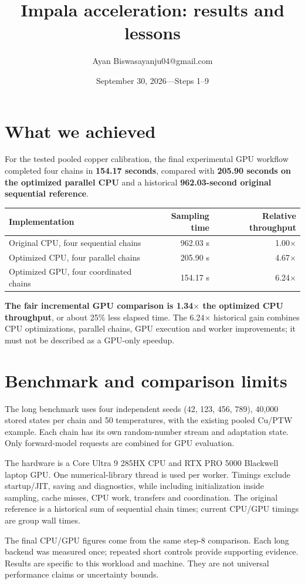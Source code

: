 \documentclass[11pt]{article}
\title{Impala acceleration: results and lessons}
\author{Ayan Biswas\quad ayanju04@gmail.com}
\date{September 30, 2026\quad---\quad Steps 1--9}
\newcommand{\heading}[1]{\section*{#1}}
\begin{document}
\maketitle
\heading{What we achieved}
For the tested pooled copper calibration, the final experimental GPU workflow
completed four chains in \textbf{154.17 seconds}, compared with
\textbf{205.90 seconds on the optimized parallel CPU} and a historical
\textbf{962.03-second original sequential reference}.

\begin{center}
\begin{tabular}{lrr}
\toprule
Implementation & Sampling time & Relative throughput\\
\midrule
Original CPU, four sequential chains & 962.03 s & 1.00$\times$\\
Optimized CPU, four parallel chains & 205.90 s & 4.67$\times$\\
Optimized GPU, four coordinated chains & 154.17 s & 6.24$\times$\\
\bottomrule
\end{tabular}
\end{center}
\textbf{The fair incremental GPU comparison is 1.34$\times$ the optimized CPU
throughput}, or about 25\% less elapsed time. The 6.24$\times$ historical gain
combines CPU optimizations, parallel chains, GPU execution and worker improvements;
it must not be described as a GPU-only speedup.

\heading{Benchmark and comparison limits}
The long benchmark uses four independent seeds (42, 123, 456, 789), 40,000 stored
states per chain and 50 temperatures, with the existing pooled Cu/PTW example.
Each chain has its own random-number stream and adaptation state. Only forward-model
requests are combined for GPU evaluation.

The hardware is a Core Ultra 9 285HX CPU and RTX PRO 5000 Blackwell laptop GPU.
One numerical-library thread is used per worker. Timings exclude startup/JIT,
saving and diagnostics, while including initialization inside sampling, cache
misses, CPU work, transfers and coordination. The original reference is a historical
sum of sequential chain times; current CPU/GPU timings are group wall times.

The final CPU/GPU figures come from the same step-8 comparison. Each long backend
was measured once; repeated short controls provide supporting evidence. Results
are specific to this workload and machine. They are not universal performance
claims or uncertainty bounds.
\end{document}
